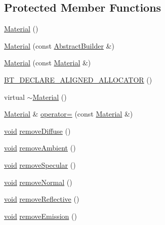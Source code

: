 \subsection*{Protected Member Functions}
\begin{DoxyCompactItemize}
\item 
\mbox{\hyperlink{classnjli_1_1_material_a95266db699eaabe4754d72f2c577deeb}{Material}} ()
\item 
\mbox{\hyperlink{classnjli_1_1_material_a9f36e174cfc3bc09e05d93ca343d625c}{Material}} (const \mbox{\hyperlink{classnjli_1_1_abstract_builder}{Abstract\+Builder}} \&)
\item 
\mbox{\hyperlink{classnjli_1_1_material_ab631f786b9f19b8fb9415f221fc57bb8}{Material}} (const \mbox{\hyperlink{classnjli_1_1_material}{Material}} \&)
\item 
\mbox{\hyperlink{classnjli_1_1_material_a4855e2ed843f6aef0db9148ff954a288}{B\+T\+\_\+\+D\+E\+C\+L\+A\+R\+E\+\_\+\+A\+L\+I\+G\+N\+E\+D\+\_\+\+A\+L\+L\+O\+C\+A\+T\+OR}} ()
\item 
virtual \mbox{\hyperlink{classnjli_1_1_material_a7c1af140483cf0f7b93db5a4098a2064}{$\sim$\+Material}} ()
\item 
\mbox{\hyperlink{classnjli_1_1_material}{Material}} \& \mbox{\hyperlink{classnjli_1_1_material_a73eec6a48a71b7129497fc980f74bb0e}{operator=}} (const \mbox{\hyperlink{classnjli_1_1_material}{Material}} \&)
\item 
\mbox{\hyperlink{_thread_8h_af1e856da2e658414cb2456cb6f7ebc66}{void}} \mbox{\hyperlink{classnjli_1_1_material_a8f7886965c92fb212d58342f77055e47}{remove\+Diffuse}} ()
\item 
\mbox{\hyperlink{_thread_8h_af1e856da2e658414cb2456cb6f7ebc66}{void}} \mbox{\hyperlink{classnjli_1_1_material_aca2f49d7b538a779edbf1b58573666b7}{remove\+Ambient}} ()
\item 
\mbox{\hyperlink{_thread_8h_af1e856da2e658414cb2456cb6f7ebc66}{void}} \mbox{\hyperlink{classnjli_1_1_material_ad10e910fba799bdc8045470161777540}{remove\+Specular}} ()
\item 
\mbox{\hyperlink{_thread_8h_af1e856da2e658414cb2456cb6f7ebc66}{void}} \mbox{\hyperlink{classnjli_1_1_material_af454f737db887890ea70cb35d16f0348}{remove\+Normal}} ()
\item 
\mbox{\hyperlink{_thread_8h_af1e856da2e658414cb2456cb6f7ebc66}{void}} \mbox{\hyperlink{classnjli_1_1_material_a0edc0a0e9ff9784bb1d63c7ddb795913}{remove\+Reflective}} ()
\item 
\mbox{\hyperlink{_thread_8h_af1e856da2e658414cb2456cb6f7ebc66}{void}} \mbox{\hyperlink{classnjli_1_1_material_af3b8bdf52a330ed4a0fcb5eca5bdb717}{remove\+Emission}} ()

\end{DoxyCompactItemize}
